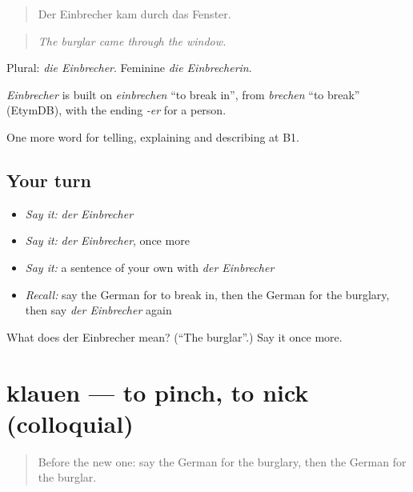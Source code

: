 \begin{quote}
Der Einbrecher kam durch das Fenster.
\end{quote}

\begin{quote}
\emph{The burglar came through the window.}
\end{quote}

Plural: \emph{die Einbrecher}. Feminine \emph{die Einbrecherin}.

\begin{cousinweb}
\emph{Einbrecher} is built on \emph{einbrechen} \textquotedblleft{}to break in\textquotedblright{}, from \emph{brechen} \textquotedblleft{}to break\textquotedblright{} (EtymDB), with the ending \emph{-er} for a person.
\end{cousinweb}

\begin{grammarlens}[title={What you've built}]
One more word for telling, explaining and describing at B1.
\end{grammarlens}

\subsection*{Your turn}
\begin{itemize}
\raggedright
  \item \emph{Say it:} \emph{der Einbrecher}
  \item \emph{Say it:} \emph{der Einbrecher}, once more
  \item \emph{Say it:} a sentence of your own with \emph{der Einbrecher}
  \item \emph{Recall:} say the German for to break in, then the German for the burglary, then say \emph{der Einbrecher} again
\end{itemize}

\begin{tcolorbox}[breakable,colback=teal!4,colframe=teal!35!black,title={Before you move on}]
What does der Einbrecher mean? (\textquotedblleft{}The burglar\textquotedblright{}.) Say it once more.
\end{tcolorbox}
\section[klauen]{klauen — to pinch, to nick (colloquial)}

\label{lesson:GE-C281-klauen}



\begin{quote}
Before the new one: say the German for the burglary, then the German for the burglar.
\end{quote}

